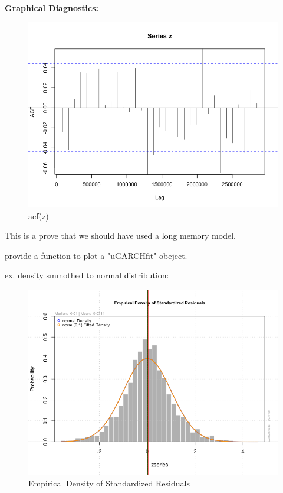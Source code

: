 \documentclass[a4paper, 11pt]{article}
\begin{document}
\textbf{Graphical Diagnostics:}\par
\begin{figure}[H]
\centering
\caption{acf(z)}
\includegraphics[scale=.60]{zacf.png}
\end{figure}
This is a prove that we should have used a long memory model.\par 


 provide a function to plot a "uGARCHfit" obeject.\par
ex. density smmothed to normal distribution:
\begin{figure}[H]
\centering
\caption{Empirical Density of Standardized Residuals}
\includegraphics[scale=.60]{density.png}
\end{figure}
 
\end{document}
